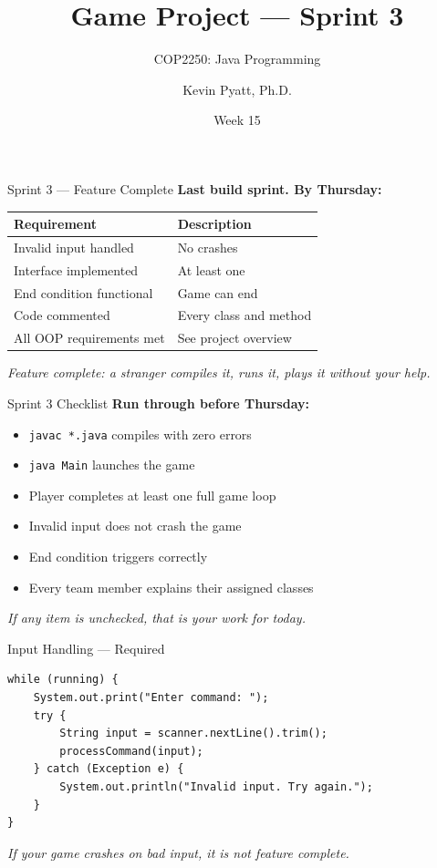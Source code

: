 \documentclass{beamer}
\title[Sprint 3]{Game Project --- Sprint 3}
\subtitle{COP2250: Java Programming}
\author{Kevin Pyatt, Ph.D.}
\institute{State College of Florida \\ Pyatt Labs}
\date{Week 15}
\begin{document}
\begin{frame}
  \titlepage
\end{frame}
\begin{frame}{Sprint 3 --- Feature Complete}
\textbf{Last build sprint. By Thursday:}
\vspace{0.3cm}
\begin{tabular}{ll}
\toprule
\textbf{Requirement} & \textbf{Description} \\
\midrule
Invalid input handled & No crashes \\
Interface implemented & At least one \\
End condition functional & Game can end \\
Code commented & Every class and method \\
All OOP requirements met & See project overview \\
\bottomrule
\end{tabular}
\vspace{0.3cm}
\textit{Feature complete: a stranger compiles it, runs it, plays it without your help.}
\end{frame}
\begin{frame}{Sprint 3 Checklist}
\textbf{Run through before Thursday:}
\vspace{0.2cm}
\begin{itemize}
  \item \texttt{javac *.java} compiles with zero errors
  \item \texttt{java Main} launches the game
  \item Player completes at least one full game loop
  \item Invalid input does not crash the game
  \item End condition triggers correctly
  \item Every team member explains their assigned classes
\end{itemize}
\vspace{0.3cm}
\textit{If any item is unchecked, that is your work for today.}
\end{frame}
\begin{frame}[fragile]{Input Handling --- Required}
\begin{lstlisting}
while (running) {
    System.out.print("Enter command: ");
    try {
        String input = scanner.nextLine().trim();
        processCommand(input);
    } catch (Exception e) {
        System.out.println("Invalid input. Try again.");
    }
}
\end{lstlisting}
\vspace{0.3cm}
\textit{If your game crashes on bad input, it is not feature complete.}
\end{frame}
\end{document}

